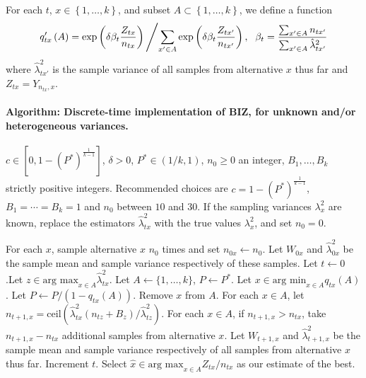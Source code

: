 \documentclass{wscpaperproc}
\newcommand{\lambdahat}{\widehat{\lambda}}
\newcommand{\xhat}{\hat{x}}
\newcommand{\upthresh}{P}
\newcommand{\cmax}{1-(P^*)^{\frac1{k-1}}}
\newcommand{\ceil}{\mathrm{ceil}}
\theoremstyle{wsc}
\begin{document}
For each $t$, $x\in\left\{ 1,\ldots,k\right\} $, and subset $A\subset\left\{ 1,\ldots,k\right\} $,
we define a function
\[
q'_{tx}\left(A\right)=\mbox{exp}\left(\delta\beta_{t}\frac{Z_{tx}}{n_{tx}}\right)\left/\sum_{x'\in A}\mbox{exp}\left(\delta\beta_{t}\frac{Z_{tx'}}{n_{tx'}}\right),\right.\mbox{ }\beta_{t}=\frac{\sum_{x'\in A}n_{tx'}}{\sum_{x'\in A}\hat{\lambda}_{tx'}^{2}}
\]
where $\hat{\lambda}_{tx'}^{2}$ is the sample variance of all samples
from alternative $x$ thus far and $Z_{tx}=Y_{n_{tx},x}$.

\paragraph{Algorithm: Discrete-time implementation of BIZ, for unknown and/or heterogeneous variances.}    
\begin{algorithmic}[1]   
\label{alg:hetero-BIZ}   
\REQUIRE $c \in [0,\cmax]$, $\delta>0$, $P^*\in(1/k,1)$, $n_0\ge0$ an integer, $B_1,\ldots,B_k$ strictly positive integers.  Recommended choices are $c=\cmax$, $B_1=\cdots=B_k=1$ and $n_0$ between $10$ and $30$.     If the sampling variances $\lambda^2_x$ are known, replace the estimators     
$\lambdahat^2_{tx}$ with the true values $\lambda^2_x$, and set $n_0=0$.     

\STATE For each $x$, sample alternative $x$ $n_0$ times and set $n_{0x} \leftarrow n_0$.     
Let $W_{0x}$ and $\lambdahat^2_{0x}$ be the sample mean and sample variance respectively of these samples.     Let $t\leftarrow 0$.Let $z \in \mbox{arg max}_{x\in A} \lambdahat^2_{tx}$.     
\STATE Let $A \leftarrow \{ 1,\ldots, k\}$, $\upthresh \leftarrow P^*$.
 \STATE Let $x\in\mbox{arg min}_{x\in A} q_{tx}\left(A\right)$.
    \STATE Let $\upthresh \leftarrow \upthresh/(1-q_{tx}\left(A\right))$.     
\STATE Remove $x$ from $A$.
\ENDWHILE    
\STATE For each $x\in A$, let      $n_{t+1,x} = \ceil\left( \lambdahat^2_{tx} (n_{tz} + B_z) / \lambdahat^2_{tz} \right)$.     \STATE For each $x\in A$, if $n_{t+1,x}>n_{tx}$, take $n_{t+1,x}-n_{tx}$ additional samples from alternative $x$.  Let $W_{t+1,x}$ and $\lambdahat^2_{t+1,x}$ be the sample mean and sample variance respectively of all samples from alternative $x$ thus far.    
\STATE Increment $t$.
 \ENDWHILE
  \STATE Select $\xhat \in\mbox{arg max}_{x\in A} Z_{tx} / n_{tx}$ as our estimate of the best.

   
\end{algorithmic} 
\hspace{5 mm}
\end{document}
